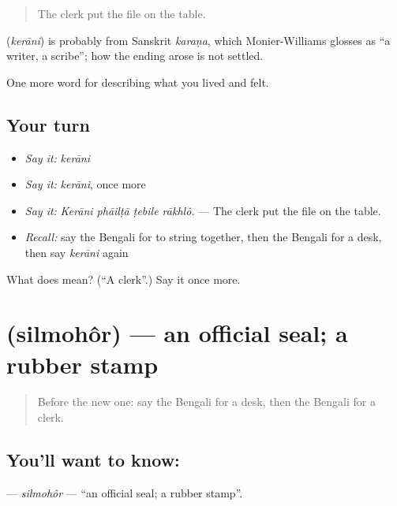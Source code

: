 \begin{quote}
The clerk put the file on the table.
\end{quote}

\begin{cousinweb}
\textbf{} (\emph{kerāni}) is probably from Sanskrit \emph{karaṇa}, which Monier-Williams glosses as \textquotedblleft{}a writer, a scribe\textquotedblright{}; how the ending arose is not settled.
\end{cousinweb}

\begin{grammarlens}[title={What you've built}]
One more word for describing what you lived and felt.
\end{grammarlens}

\subsection*{Your turn}
\begin{itemize}
\raggedright
  \item \emph{Say it:} \emph{kerāni}
  \item \emph{Say it:} \emph{kerāni}, once more
  \item \emph{Say it:} \emph{Kerāni phāilṭā ṭebile rākhlô.} — The clerk put the file on the table.
  \item \emph{Recall:} say the Bengali for to string together, then the Bengali for a desk, then say \emph{kerāni} again
\end{itemize}

\begin{tcolorbox}[breakable,colback=teal!4,colframe=teal!35!black,title={Before you move on}]
What does  mean? (\textquotedblleft{}A clerk\textquotedblright{}.) Say it once more.
\end{tcolorbox}
\section[\texorpdfstring{\bn{সিলমোহর} (silmohôr)}{সিলমোহর (silmohôr)}]{ (silmohôr) — an official seal; a rubber stamp}

\label{lesson:BN-C493-silmohor}



\begin{quote}
Before the new one: say the Bengali for a desk, then the Bengali for a clerk.
\end{quote}

\subsection*{You'll want to know: }
\textbf{} — \emph{silmohôr} — \textquotedblleft{}an official seal; a rubber stamp\textquotedblright{}.

